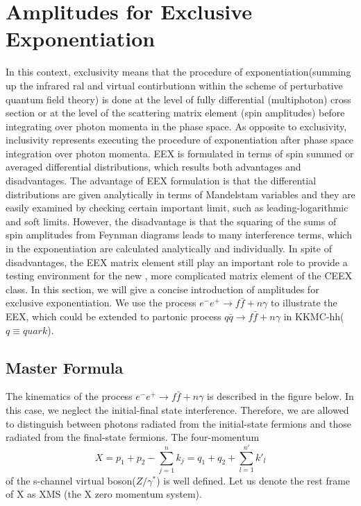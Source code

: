 \section{Amplitudes for Exclusive Exponentiation} 
In this context, exclusivity means that the procedure of exponentiation(summing up the infrared ral and virtual contirbutionn within the scheme of perturbative quantum field theory) is done at the level of fully differential (multiphoton) cross section or at the level of the scattering matrix element (spin amplitudes) before integrating over photon momenta  in the phase space. As opposite to exclusivity, inclusivity represents executing the procedure of exponentiation after phase space integration over photon momenta. EEX is formulated in terms of spin summed or averaged differential distributions, which results both advantages and disadvantages. The advantage of EEX formulation is that the differential distributions are given analytically in terms of Mandelstam variables and they are easily examined by checking certain important limit, such as leading-logarithmic and soft limits. However, the disadvantage is that the squaring of the sums of spin amplitudes from Feynman diagrams leads to many interference terms, which in the exponentiation  are calculated analytically and individually. In spite of disadvantages, the EEX matrix element still play an important role to provide a testing environment for the new , more complicated matrix element of the CEEX class. In this section, we will give a concise introduction of amplitudes for exclusive exponentiation. We use the process $e^- e^+ \to f\bar{f} + n\gamma$ to illustrate the EEX, which could be extended to partonic process $q\bar{q} \to f\bar{f} + n\gamma$ in KKMC-hh($q\equiv quark$).

\subsection{Master Formula}
The kinematics of the process $e^- e^+ \to f\bar{f} + n\gamma$ is described in the figure below. In this case, we neglect the initial-final state interference. Therefore, we are allowed to distinguish between photons radiated from the initial-state fermions and those radiated from the final-state fermions. The four-momentum 
\begin{equation}
X = p_1 + p_2-\sum_{j=1}^{n} k_j = q_1+q_2+\sum_{l=1}^{n'} k'_l
\end{equation}
of the s-channel virtual boson($Z/\gamma^\ast$) is well defined. Let us denote the rest frame of X as XMS (the X zero momentum system).

